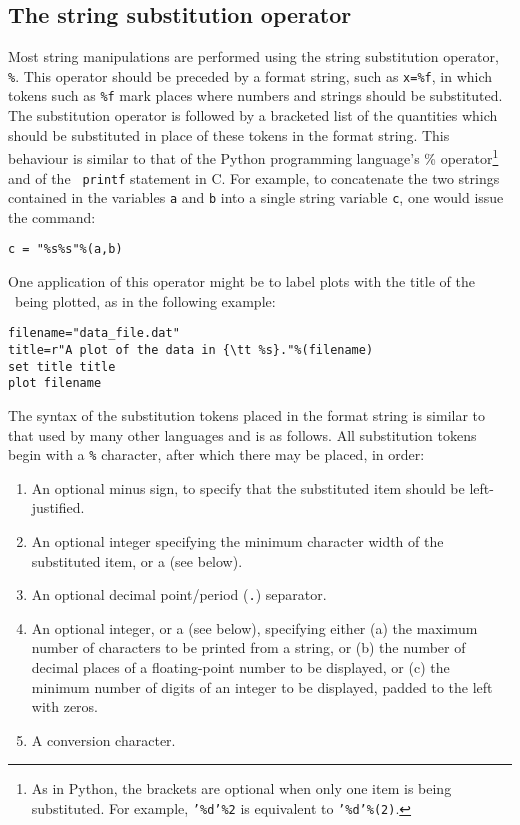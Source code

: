 \subsection{The string substitution operator}
\label{sec:stringsubop}

Most string manipulations are performed using the string substitution operator,
{\tt \%}. This operator should be preceded
by a format string, such as {\tt x=\%f}, in which tokens such as {\tt \%f} mark
places where numbers and strings should be substituted. The substitution
operator is followed by a bracketed list of the quantities which should be
substituted in place of these tokens in the format string. This behaviour is
similar to that of the Python programming language's \% operator\footnote{As in
Python, the brackets are optional when only one item is being substituted. For
example, {\tt '\%d'\%2} is equivalent to {\tt '\%d'\%(2)}.} and of the {\tt
printf} statement in C.  For example, to concatenate the two strings contained
in the variables {\tt a} and {\tt b} into a single string variable {\tt c}, one
would issue the command:

\begin{verbatim}
c = "%s%s"%(a,b)
\end{verbatim}

One application of this operator might be to label plots with the title of the
\datafile\ being plotted, as in the following example:
\begin{verbatim}
filename="data_file.dat"
title=r"A plot of the data in {\tt %s}."%(filename)
set title title
plot filename
\end{verbatim}

The syntax of the substitution tokens placed in the format string is similar to
that used by many other languages and is as follows. All substitution tokens
begin with a {\tt \%} character, after which there may be placed, in order:

\begin{enumerate}
\item An optional minus sign, to specify that the substituted item should be left-justified.
\item An optional integer specifying the minimum character width of the substituted item, or a {\tt *} (see below).
\item An optional decimal point/period ({\tt .}) separator.
\item An optional integer, or a {\tt *} (see below), specifying either (a) the maximum number of characters to be printed from a string, or (b) the number of decimal places of a floating-point number to be displayed, or (c) the minimum number of digits of an integer to be displayed, padded to the left with zeros.
\item A conversion character.
\end{enumerate}

